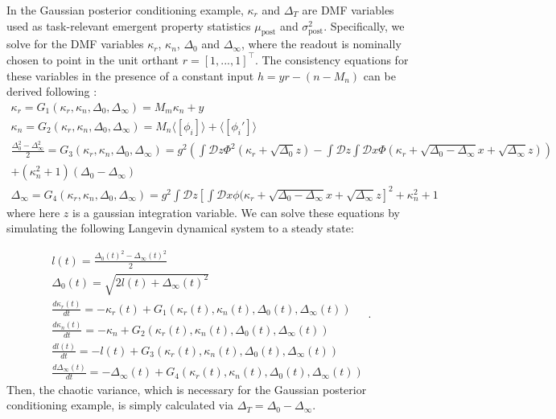 \documentclass[11pt]{article}
\begin{document}
In the Gaussian posterior conditioning example, $\kappa_r$ and $\Delta_T$ are DMF variables used as task-relevant emergent property statistics $\mu_{\text{post}}$ and $\sigma^2_{\text{post}}$.
Specifically, we solve for the DMF variables $\kappa_r$, $\kappa_n$, $\Delta_0$ and $\Delta_\infty$, where the readout is nominally chosen to point in the unit orthant $r = [1, ..., 1]^\top$.  The consistency equations for these variables in the presence of a constant input $h = y r - (n - M_n)$ can be derived following \cite{mastrogiuseppe2018linking}:
{\small
\begin{equation}
\begin{split}
\kappa_r = G_1(\kappa_r, \kappa_n, \Delta_0, \Delta_\infty) = M_m \kappa_n + y \\
\kappa_n = G_2(\kappa_r, \kappa_n, \Delta_0, \Delta_\infty) = M_n \langle \left[ \phi_i \right] \rangle + \langle \left[ \phi_i' \right] \rangle \\
\frac{\Delta_0^2-\Delta_\infty^2}{2} = G_3(\kappa_r, \kappa_n, \Delta_0, \Delta_\infty) = g^2 \left( \int \mathcal{D}z \Phi^2(\kappa_r + \sqrt{\Delta_0}z) - \int \mathcal{D}z \int \mathcal{D}x \Phi(\kappa_r + \sqrt{\Delta_0 - \Delta_\infty}x + \sqrt{\Delta_\infty}z)  \right) \\
+ (\kappa_n^2  + 1)(\Delta_0-\Delta_\infty) \\
\Delta_\infty = G_4(\kappa_r, \kappa_n, \Delta_0, \Delta_\infty)  = g^2 \int \mathcal{D}z \left[ \int \mathcal{D}x \phi(\kappa_r + \sqrt{\Delta_0 - \Delta_\infty}x + \sqrt{\Delta_\infty}z \right]^2 + \kappa_n^2 + 1
\end{split} 
\end{equation}
}
where here $z$ is a gaussian integration variable. We can solve these equations by simulating the following Langevin dynamical system to a steady state:

\begin{equation}
\begin{split}
l(t) = \frac{\Delta_0(t)^2-\Delta_\infty(t)^2}{2} \\
\Delta_0(t) = \sqrt{2l(t) + \Delta_\infty(t)^2} \\
\frac{d \kappa_r(t)}{dt}  = -\kappa_r(t) + G_1(\kappa_r(t), \kappa_n(t), \Delta_0(t), \Delta_\infty(t)) \\
\frac{d \kappa_n(t)}{dt} = -\kappa_n + G_2(\kappa_r(t), \kappa_n(t), \Delta_0(t), \Delta_\infty(t)) \\
\frac{d l(t)}{dt}  = -l(t) + G_3(\kappa_r(t), \kappa_n(t), \Delta_0(t), \Delta_\infty(t)) \\
\frac{d \Delta_\infty(t)}{dt}  = -\Delta_\infty(t) + G_4(\kappa_r(t), \kappa_n(t), \Delta_0(t), \Delta_\infty(t))
\end{split}.
\end{equation}
Then, the chaotic variance, which is necessary for the Gaussian posterior conditioning example, is simply calculated via $\Delta_T = \Delta_0 - \Delta_\infty$.
\end{document}
